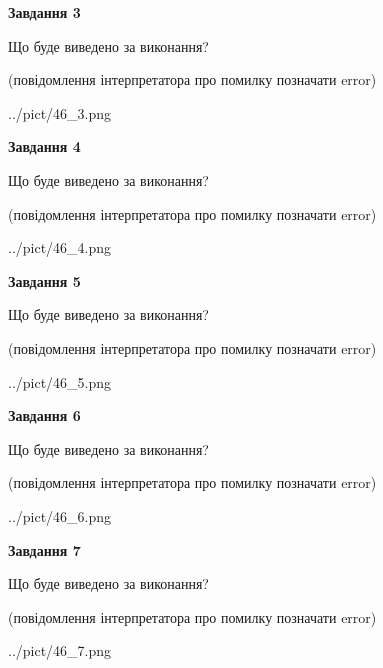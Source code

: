 \documentclass[12pt, ukrainian]{article}
\begin{document}
{\begin {large}
{\begin {center}\textbf{Завдання 3}\end {center}}\par
Що буде виведено за виконання?\par
 (повідомлення інтерпретатора про помилку позначати error)\par
\begin{center}
	{../pict/46_3.png}
\end{center}
\newpage

{\begin {center}\textbf{Завдання 4}\end {center}}\par
Що буде виведено за виконання?\par
 (повідомлення інтерпретатора про помилку позначати error)\par
\begin{center}
	{../pict/46_4.png}
\end{center}
\newpage

{\begin {center}\textbf{Завдання 5}\end {center}}\par
Що буде виведено за виконання?\par
 (повідомлення інтерпретатора про помилку позначати error)\par
\begin{center}
	{../pict/46_5.png}
\end{center}
\newpage

{\begin {center}\textbf{Завдання 6}\end {center}}\par
Що буде виведено за виконання?\par
 (повідомлення інтерпретатора про помилку позначати error)\par
\begin{center}
	{../pict/46_6.png}
\end{center}
\newpage

{\begin {center}\textbf{Завдання 7}\end {center}}\par
Що буде виведено за виконання?\par
 (повідомлення інтерпретатора про помилку позначати error)\par
\begin{center}
	{../pict/46_7.png}
\end{center}
\newpage


\end{large}}
\end{document}
